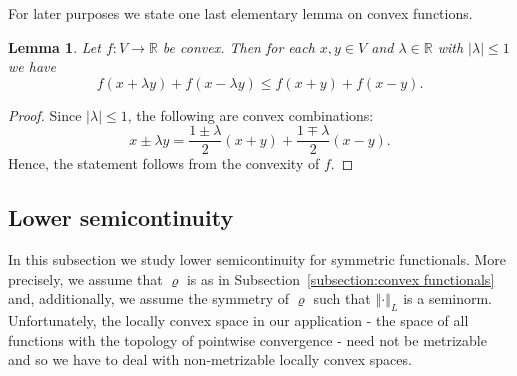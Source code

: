 \documentclass[a4paper,11pt,reqno]{amsart}
\newtheorem{lemma}{Lemma}[section]
\theoremstyle{definition}
\newtheorem{remark}[lemma]{Remark}
\numberwithin{equation}{section}
\newcommand{\R}{{\mathbb R}}
\newcommand{\vr}{{\varrho}}
\newcommand{\av}[1]{\left\Vert #1\right\Vert}
\newcommand{\1}{\mathds{1}}
\begin{document}


% 
%  


For later purposes we state one last elementary lemma on convex functions. 


\begin{lemma}\label{lemma:convexity estimate}
Let $f \colon V \to \R$ be convex. Then for each $x,y \in V$ and $\lambda \in \R$ with $| \lambda | \leq 1$ we have 
 $$f(x + \lambda y) + f(x - \lambda y) \leq f(x + y) + f(x - y).$$
\end{lemma}
\begin{proof}
Since $|\lambda| \leq 1$, the following are convex combinations: 
%
$$x \pm \lambda y = \frac{1 \pm \lambda}{2} (x + y) + \frac{1 \mp \lambda}{2} (x - y). $$
%
Hence, the statement follows from the convexity of $f$. 
\end{proof}




\subsection{Lower semicontinuity}




In this subsection we study lower semicontinuity  for symmetric functionals. More precisely, we assume that $\vr$ is as in Subsection~\ref{subsection:convex functionals} and,  additionally, we assume the symmetry of $\vr$ such that $\av{\cdot}_L$ is a seminorm. Unfortunately, the locally convex space in our application -  the space of all functions with the topology of pointwise convergence - need  not be metrizable  and so we have to deal with non-metrizable locally convex spaces. 
\end{document}
